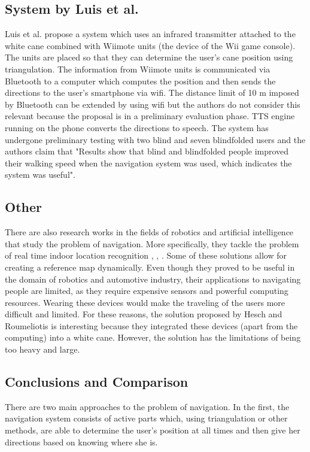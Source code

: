 \subsection{System by Luis et al.}
Luis et al. \cite{luis} propose a system which uses an infrared transmitter attached to the white cane combined with Wiimote units (the device of the Wii game console). The units are placed so that they can determine the user's cane position using triangulation. The information from Wiimote units is communicated via Bluetooth to a computer which computes the position and then sends the directions to the user's smartphone via wifi. The distance limit of 10 m imposed by Bluetooth can be extended by using wifi but the authors do not consider this relevant because the proposal is in a preliminary evaluation phase. TTS engine running on the phone converts the directions to speech. The system has undergone preliminary testing with two blind and seven blindfolded users and the authors claim that "Results show that blind and blindfolded people improved their walking speed when the navigation system was used, which indicates the system was useful".

\subsection{Other}
There are also research works in the fields of robotics and artificial intelligence that study the problem of navigation. More specifically, they tackle the problem of real time indoor location recognition \cite{espinace}, \cite{quattoni}, \cite{bosch}. Some of these solutions allow for creating a reference map dynamically. Even though they proved to be useful in the domain of robotics and automotive industry, their applications to navigating people are limited, as they require expensive sensors and powerful computing resources. Wearing these devices would make the traveling of the users more difficult and limited. For these reasons, the solution proposed by Hesch and Roumeliotis \cite{hesch} is interesting because they integrated these devices (apart from the computing) into a white cane. However, the solution has the limitations of being too heavy and large.

\subsection{Conclusions and Comparison}
There are two main approaches to the problem of navigation. In the first, the navigation system consists of active parts which, using triangulation or other methods, are able to determine the user's position at all times and then give her directions based on knowing where she is.

